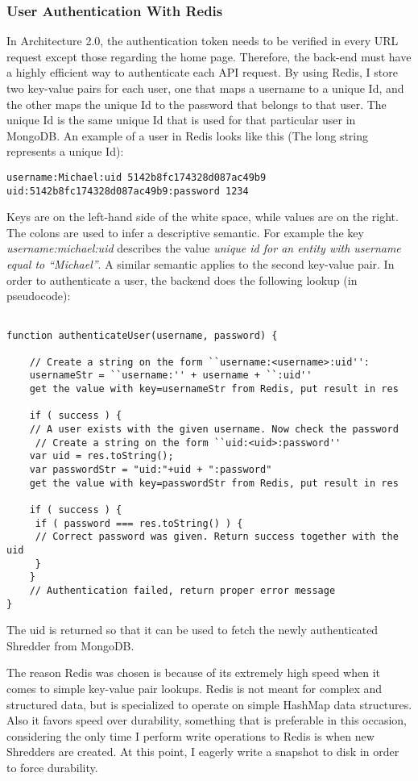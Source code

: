 \subsubsection{User Authentication With Redis}
 In Architecture 2.0, the authentication token needs to be verified in every URL request except those regarding the home page. Therefore, the back-end must have a highly efficient way to authenticate each API request. By using Redis, I store two key-value pairs for each user, one that maps a username to a unique Id, and the other maps the unique Id to the password that belongs to that user. The unique Id is the same unique Id that is used for that particular user in MongoDB. An example of a user in Redis looks like this (The long string represents a unique Id):
\begin{lstlisting}
username:Michael:uid 5142b8fc174328d087ac49b9
uid:5142b8fc174328d087ac49b9:password 1234
\end{lstlisting}
Keys are on the left-hand side of the white space, while values are on the right. The colons are used to infer a descriptive semantic. For example the key \textit{username:michael:uid} describes the value \textit{unique id for an entity with username equal to ``Michael''}. A similar semantic applies to the second key-value pair. In order to authenticate a user, the backend does the following lookup (in pseudocode):
\begin{lstlisting}

function authenticateUser(username, password) {

	// Create a string on the form ``username:<username>:uid'':
	usernameStr = ``username:'' + username + ``:uid'' 
	get the value with key=usernameStr from Redis, put result in res
	
	if ( success ) {
	// A user exists with the given username. Now check the password
	 // Create a string on the form ``uid:<uid>:password''
	var uid = res.toString();
	var passwordStr = "uid:"+uid + ":password"
	get the value with key=passwordStr from Redis, put result in res
	
	if ( success ) {
	 if ( password === res.toString() ) {
	 // Correct password was given. Return success together with the uid 
	 }	
	}	
	// Authentication failed, return proper error message
} 
\end{lstlisting}
The uid is returned so that it can be used to fetch the newly authenticated Shredder from MongoDB. 

The reason Redis was chosen is because of its extremely high speed when it comes to simple key-value pair lookups. Redis is not meant for complex and structured data, but is specialized to operate on simple HashMap data structures. Also it favors speed over durability, something that is preferable in this occasion, considering the only time I perform write operations to Redis is when new Shredders are created. At this point, I eagerly write a snapshot to disk in order to force durability. 

